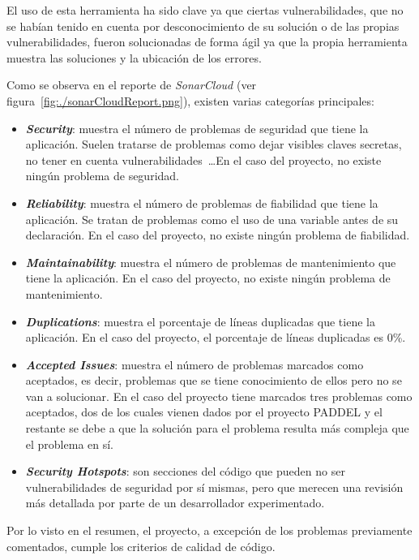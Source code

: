 El uso de esta herramienta ha sido clave ya que ciertas vulnerabilidades, que no se habían tenido en cuenta por desconocimiento de su solución o de las propias vulnerabilidades, fueron solucionadas de forma ágil ya que la propia herramienta muestra las soluciones y la ubicación de los errores.


Como se observa en el reporte de \textit{SonarCloud} (ver figura~\ref{fig:./sonarCloudReport.png}), existen varias categorías principales:
\begin{itemize}
\item \textit{\textbf{Security}}: muestra el número de problemas de seguridad que tiene la aplicación. Suelen tratarse de problemas como dejar visibles claves secretas, no tener en cuenta vulnerabilidades~\ldots En el caso del proyecto, no existe ningún problema de seguridad.
\item \textit{\textbf{Reliability}}: muestra el número de problemas de fiabilidad que tiene la aplicación. Se tratan de problemas como el uso de una variable antes de su declaración. En el caso del proyecto, no existe ningún problema de fiabilidad.
\item \textit{\textbf{Maintainability}}: muestra el número de problemas de mantenimiento que tiene la aplicación. En el caso del proyecto, no existe ningún problema de mantenimiento.
\item \textit{\textbf{Duplications}}: muestra el porcentaje de líneas duplicadas que tiene la aplicación. En el caso del proyecto, el porcentaje de líneas duplicadas es 0\%.
\item \textit{\textbf{Accepted Issues}}: muestra el número de problemas marcados como aceptados, es decir, problemas que se tiene conocimiento de ellos pero no se van a solucionar. En el caso del proyecto tiene marcados tres problemas como aceptados, dos de los cuales vienen dados por el proyecto PADDEL y el restante se debe a que la solución para el problema resulta más compleja que el problema en sí.
\item \textit{\textbf{Security Hotspots}}: son secciones del código que pueden no ser vulnerabilidades de seguridad por sí mismas, pero que merecen una revisión más detallada por parte de un desarrollador experimentado.
\end{itemize}

Por lo visto en el resumen, el proyecto, a excepción de los problemas previamente comentados, cumple los criterios de calidad de código.


